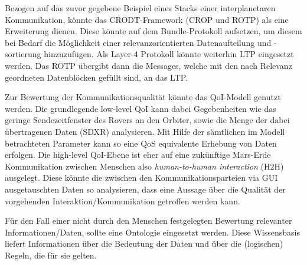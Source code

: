 Bezogen auf das zuvor gegebene Beispiel eines Stacks einer interplanetaren
Kommunikation, k{\"o}nnte das \gls{CRODT}-Framework (\gls{CROP} und \gls{ROTP}) als eine
Erweiterung dienen. Diese k{\"o}nnte auf dem Bundle-Protokoll aufsetzen, um
diesem bei Bedarf die M{\"o}glichkeit einer relevanzorientierten
Datenaufteilung und -sortierung hinzuzuf{\"u}gen. Als Layer-4 Protokoll
k{\"o}nnte weiterhin \gls{LTP} eingesetzt werden. Das \gls{ROTP} {\"u}bergibt dann die
Messages, welche mit den nach Relevanz geordneten Datenbl{\"o}cken gef{\"u}llt
sind, an das \gls{LTP}.

Zur Bewertung der Kommunikationsqualit{\"a}t k{\"o}nnte das \gls{QoI}-Modell genutzt
werden. Die grundlegende low-level \gls{QoI} kann dabei Gegebenheiten wie das geringe
Sendezeitfenster des Rovers an den Orbiter, sowie die Menge der dabei
{\"u}bertragenen Daten (SDXR) analysieren. Mit Hilfe der s{\"a}mtlichen im
Modell betrachteten Parameter kann so eine \gls{QoS} equivalente Erhebung von
Daten erfolgen. Die high-level \gls{QoI}-Ebene ist eher auf eine zuk{\"u}nftige
Mars-Erde Kommunikation zwischen Menschen also \textit{human-to-human
interaction} (H2H) ausgelegt. Diese k{\"o}nnte die zwischen den
Kommunikationsparteien via GUI ausgetauschten Daten so analysieren, dass eine
Aussage {\"u}ber die Qualit{\"a}t der vorgehenden Interaktion/Kommunikation
getroffen werden kann.

F{\"u}r den Fall einer nicht durch den Menschen festgelegten Bewertung
relevanter Informationen/Daten, sollte eine Ontologie eingesetzt werden. Diese
Wissensbasis liefert Informationen {\"u}ber die Bedeutung der Daten und {\"u}ber
die (logischen) Regeln, die f{\"u}r sie gelten.

